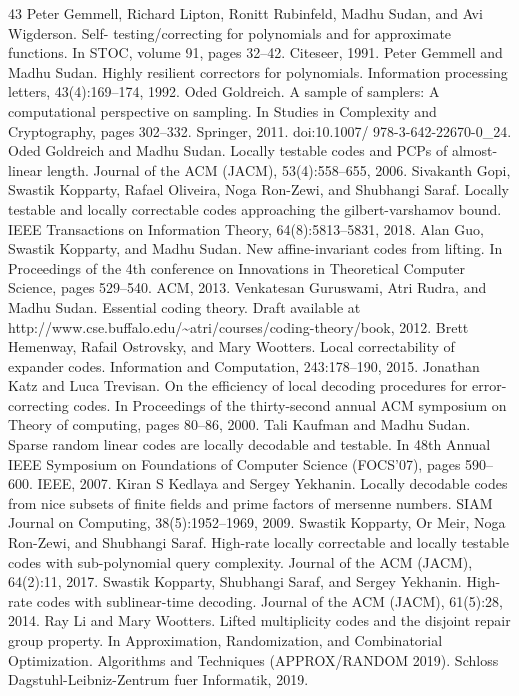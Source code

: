 \begin{thebibliography}{43}
Peter Gemmell, Richard Lipton, Ronitt Rubinfeld, Madhu Sudan, and Avi Wigderson. Self- testing/correcting for polynomials and for approximate functions. In STOC, volume 91, pages 32–42. Citeseer, 1991.
Peter Gemmell and Madhu Sudan. Highly resilient correctors for polynomials. Information processing letters, 43(4):169–174, 1992.
Oded Goldreich. A sample of samplers: A computational perspective on sampling. In Studies in Complexity and Cryptography, pages 302–332. Springer, 2011. doi:10.1007/ 978-3-642-22670-0\_24.
Oded Goldreich and Madhu Sudan. Locally testable codes and PCPs of almost-linear length. Journal of the ACM (JACM), 53(4):558–655, 2006.
Sivakanth Gopi, Swastik Kopparty, Rafael Oliveira, Noga Ron-Zewi, and Shubhangi Saraf. Locally testable and locally correctable codes approaching the gilbert-varshamov bound. IEEE Transactions on Information Theory, 64(8):5813–5831, 2018.
Alan Guo, Swastik Kopparty, and Madhu Sudan. New affine-invariant codes from lifting. In Proceedings of the 4th conference on Innovations in Theoretical Computer Science, pages 529–540. ACM, 2013.
Venkatesan Guruswami, Atri Rudra, and Madhu Sudan. Essential coding theory. Draft available at http://www.cse.buffalo.edu/\textasciitilde{}atri/courses/coding-theory/book, 2012.
Brett Hemenway, Rafail Ostrovsky, and Mary Wootters. Local correctability of expander codes. Information and Computation, 243:178–190, 2015.
Jonathan Katz and Luca Trevisan. On the efficiency of local decoding procedures for error- correcting codes. In Proceedings of the thirty-second annual ACM symposium on Theory of computing, pages 80–86, 2000.
Tali Kaufman and Madhu Sudan. Sparse random linear codes are locally decodable and testable. In 48th Annual IEEE Symposium on Foundations of Computer Science (FOCS’07), pages 590–600. IEEE, 2007.
Kiran S Kedlaya and Sergey Yekhanin. Locally decodable codes from nice subsets of finite fields and prime factors of mersenne numbers. SIAM Journal on Computing, 38(5):1952–1969, 2009.
Swastik Kopparty, Or Meir, Noga Ron-Zewi, and Shubhangi Saraf. High-rate locally correctable and locally testable codes with sub-polynomial query complexity. Journal of the ACM (JACM), 64(2):11, 2017.
Swastik Kopparty, Shubhangi Saraf, and Sergey Yekhanin. High-rate codes with sublinear-time decoding. Journal of the ACM (JACM), 61(5):28, 2014.
Ray Li and Mary Wootters. Lifted multiplicity codes and the disjoint repair group property. In Approximation, Randomization, and Combinatorial Optimization. Algorithms and Techniques (APPROX/RANDOM 2019). Schloss Dagstuhl-Leibniz-Zentrum fuer Informatik, 2019.

\end{thebibliography}
